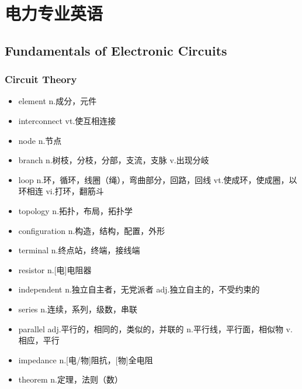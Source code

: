 \chapter{电力专业英语}
\section{Fundamentals of Electronic Circuits}
\subsection{Circuit Theory}
\begin{multicols}{2}
    \begin{itemize}
        \item element n.成分，元件
        \item interconnect vt.使互相连接
        \item node n.节点
        \item branch n.树枝，分枝，分部，支流，支脉 v.出现分岐
        \item loop n.环，循环，线圈（绳），弯曲部分，回路，回线 vt.使成环，使成圈，以环相连 vi.打环，翻筋斗
        \item topology n.拓扑，布局，拓扑学
        \item configuration n.构造，结构，配置，外形
        \item terminal n.终点站，终端，接线端
        \item resistor n.[电]电阻器
        \item independent n.独立自主者，无党派者 adj.独立自主的，不受约束的
        \item series n.连续，系列，级数，串联
        \item parallel adj.平行的，相同的，类似的，并联的 n.平行线，平行面，相似物 v.相应，平行
        \item impedance n.[电/物]阻抗，[物]全电阻
        \item theorem n.定理，法则（数）
    \end{itemize}
\end{multicols}

